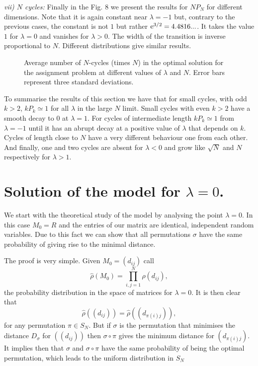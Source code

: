 \documentclass[]{iopart}
\begin{document}
{\it vii) $N$ cycles:}
Finally in the Fig. 8 we present the results for $NP_N$ for different 
dimensions.
Note that it is again constant near $\lambda=-1$
but, contrary to the previous cases, the constant is not $1$ but rather
${\rm e}^{3/2}=4.4816...$. It takes the value 
$1$ for $\lambda=0$ and vanishes for $\lambda>0$. The width 
of the transition is inverse proportional to $N$. Different distributions 
give similar results. 
\begin{figure}[h!]
\caption{\small Average number of $N$-cycles (times $N$) in the
 optimal solution for
  the assignment problem at different values of $\lambda$ and  $N$.
  Error bars represent three standard deviations.}
\label{pn}
\end{figure}


To summarise the results of this section
we have that for small cycles,
with odd $k>2$,
$kP_k\simeq 1$ for all $\lambda$ in the large $N$ limit.
Small cycles with even $k>2$ have a smooth decay to $0$ at $\lambda=1$. 
For cycles of intermediate length 
$kP_k\simeq 1$ from $\lambda=-1$ until it has an abrupt 
decay at a positive value of $\lambda$
that depends on $k$. 
Cycles of length close to $N$ have a very different behaviour
one from each other. 
And finally, one and two
cycles are absent for $\lambda<0$ and grow
like $\sqrt N$ and $N$ respectively for $\lambda>1$.


\section{Solution of the model for $\lambda=0$.}

We start with the theoretical study of the model
by analysing the point $\lambda=0$. In this case
$M_{0}=R$ and the entries of our matrix
are identical, independent random variables.
Due to this fact we can show that all permutations $\sigma$ 
have the same probability of giving rise to the minimal 
distance. 

The proof is very simple.
Given $M_0=(d_{{i}{j}})$ call 
$${\hat\rho}(M_0)=\prod_{i,j=1}^N\rho(d_{{i}{j}}),$$ 
the probability distribution in the space of matrices
for $\lambda=0$.
It is then clear that
$${\hat\rho}((d_{{i}{j}}))=\hat\rho((d_{\pi(i)j})),$$
for any permutation $\pi\in S_N$.
But if $\sigma$ is the permutation that minimises
the distance $D_\sigma$ for $((d_{{i}{j}}))$ then
$\sigma\circ\pi$ gives the minimum distance for
$(d_{\pi(i)j})$. It implies then that $\sigma$ and $\sigma\circ\pi$
have the same probability of being the optimal permutation,
which leads to the uniform distribution in $S_N$
\end{document}
